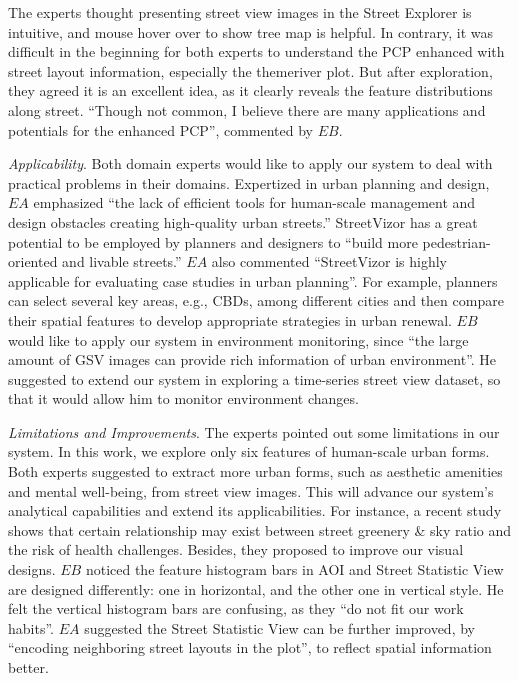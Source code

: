 The experts thought presenting street view images in the Street Explorer is intuitive, and mouse hover over to show tree map is helpful.
In contrary, it was difficult in the beginning for both experts to understand the PCP enhanced with street layout information, especially the themeriver plot.
But after exploration, they agreed it is an excellent idea, as it clearly reveals the feature distributions along street.
``Though not common, I believe there are many applications and potentials for the enhanced PCP'', commented by $EB$. 

\vspace*{2mm}
\noindent
\textit{Applicability}.
Both domain experts would like to apply our system to deal with practical problems in their domains. 
Expertized in urban planning and design, $EA$ emphasized ``the lack of efficient tools for human-scale management and design obstacles creating high-quality urban streets.''
 StreetVizor has a great potential to be employed by planners and designers to ``build more pedestrian-oriented and livable streets.'' 
$EA$ also commented ``StreetVizor is highly applicable for evaluating case studies in urban planning''. 
For example, planners can select several key areas, e.g., CBDs, among different cities and then compare their spatial features to develop appropriate strategies in urban renewal.
$EB$ would like to apply our system in environment monitoring, since ``the large amount of GSV images can provide rich information of urban environment''.
He suggested to extend our system in exploring a time-series street view dataset, so that it would allow him to monitor environment changes.

\vspace*{2mm}
\noindent
\textit{Limitations and Improvements}.
The experts pointed out some limitations in our system.
In this work, we explore only six features of human-scale urban forms.
Both experts suggested to extract more urban forms, such as aesthetic amenities and mental well-being, from street view images.
This will advance our system's analytical capabilities and extend its applicabilities.
For instance, a recent study~\cite{jiang_2014_dose} shows that certain relationship may exist between street greenery \& sky ratio and the risk of health challenges.
Besides, they proposed to improve our visual designs.
$EB$ noticed the feature histogram bars in AOI and Street Statistic View are designed differently: one in horizontal, and the other one in vertical style.
He felt the vertical histogram bars are confusing, as they ``do not fit our work habits''.
$EA$ suggested the Street Statistic View can be further improved, by ``encoding neighboring street layouts in the plot'', to reflect spatial information better.
